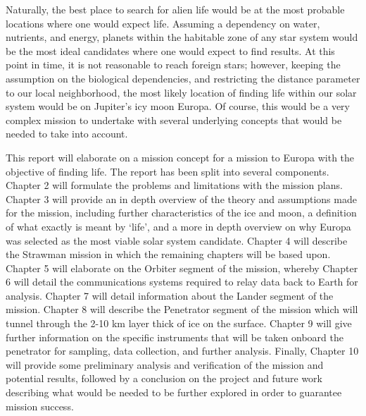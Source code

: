 Naturally, the best place to search for alien life would be at the most probable locations where one would expect life. Assuming a dependency on water, nutrients, and energy, planets within the habitable zone of any star system would be the most ideal candidates where one would expect to find results. At this point in time, it is not reasonable to reach foreign stars; however, keeping the assumption on the biological dependencies, and restricting the distance parameter to our local neighborhood, the most likely location of finding life within our solar system would be on Jupiter's icy moon Europa. Of course, this would be a very complex mission to undertake with several underlying concepts that would be needed to take into account.

This report will elaborate on a mission concept for a mission to Europa with the objective of finding life. The report has been split into several components. Chapter 2 will formulate the problems and limitations with the mission plans. Chapter 3 will provide an in depth overview of the theory and assumptions made for the mission, including further characteristics of the ice and moon, a definition of what exactly is meant by `life', and a more in depth overview on why Europa was selected as the most viable solar system candidate. Chapter 4 will describe the Strawman mission in which the remaining chapters will be based upon.  Chapter 5 will elaborate on the Orbiter segment of the mission, whereby Chapter 6 will detail the communications systems required to relay data back to Earth for analysis. Chapter 7 will detail information about the Lander segment of the mission. Chapter 8 will describe the Penetrator segment of the mission which will tunnel through the 2-10 km layer thick of ice on the surface. Chapter 9 will give further information on the specific instruments that will be taken onboard the penetrator for sampling, data collection, and further analysis. Finally, Chapter 10 will provide some preliminary analysis and verification of the mission and potential results, followed by a conclusion on the project and future work describing what would be needed to be further explored in order to guarantee mission success.